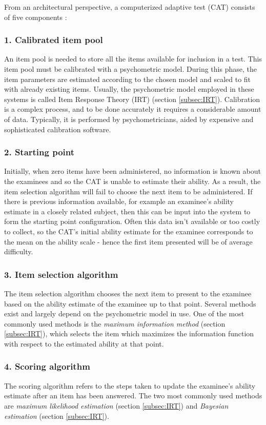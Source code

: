 From an architectural perspective, a computerized adaptive test (CAT) consists of five components \cite{CAT-Framework}:

\subsubsection{1. Calibrated item pool}
An item pool is needed to store all the items available for inclusion in a test. This item pool must be calibrated with a psychometric model. During this phase, the item parameters are estimated according to the chosen model and scaled to fit with already existing items. Usually, the psychometric model employed in these systems is called Item Response Theory (IRT) (section \ref{subsec:IRT}). Calibration is a complex process, and to be done accurately it requires a considerable amount of data. Typically, it is performed by psychometricians, aided by expensive and sophisticated calibration software.

\subsubsection{2. Starting point}
Initially, when zero items have been administered, no information is known about the examinees and so the CAT is unable to estimate their ability. As a result, the item selection algorithm will fail to choose the next item to be administered.
If there is previous information available, for example an examinee's ability estimate in a closely related subject, then this can be input into the system to form the starting point configuration. Often this data isn't available or too costly to collect, so the CAT's initial ability estimate for the examinee corresponds to the mean on the ability scale - hence the first item presented will be of average difficulty.

\subsubsection{3. Item selection algorithm}
The item selection algorithm chooses the next item to present to the examinee based on the ability estimate of the examinee up to that point. Several methods exist and largely depend on the psychometric model in use. One of the most commonly used methods is the \textit{maximum information method} (section \ref{subsec:IRT}), which selects the item which maximizes the information function with respect to the estimated ability at that point.

\subsubsection{4. Scoring algorithm}
The scoring algorithm refers to the steps taken to update the examinee's ability estimate after an item has been answered. The two most commonly used methods are \textit{maximum likelihood estimation} (section \ref{subsec:IRT}) and \textit{Bayesian estimation} (section \ref{subsec:IRT}).

